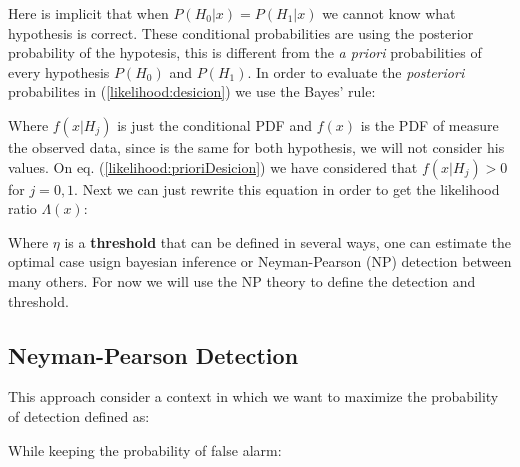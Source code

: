 \newp Here is implicit that when $P(H_0|x) = P(H_1|x)$ we cannot know what hypothesis is correct. These conditional probabilities are using the posterior probability of the hypotesis, this is different from the \textit{a priori} probabilities of every hypothesis $P(H_0)$ and $P(H_1)$. In order to evaluate the \textit{posteriori} probabilites in (\ref{likelihood:desicion}) we use the Bayes' rule:


\newp Where $f(x|H_j)$ is just the conditional PDF and $f(x)$ is the PDF of measure the observed data, since is the same for both hypothesis, we will not consider his values. On eq. (\ref{likelihood:prioriDesicion}) we have considered that $f(x|H_j) > 0$ for $j=0,1$. Next we can just rewrite this equation in order to get the likelihood ratio $\Lambda(x)$:


\newp Where $\eta$ is a \textbf{threshold} that can be defined in several ways, one can estimate the optimal case usign bayesian inference or Neyman-Pearson (NP) detection between many others. For now we will use the NP theory to define the detection and threshold.

\subsection{Neyman-Pearson Detection}
\newp This approach consider a context in which we want to maximize the probability of detection defined as:


\newp While keeping the probability of false alarm:


